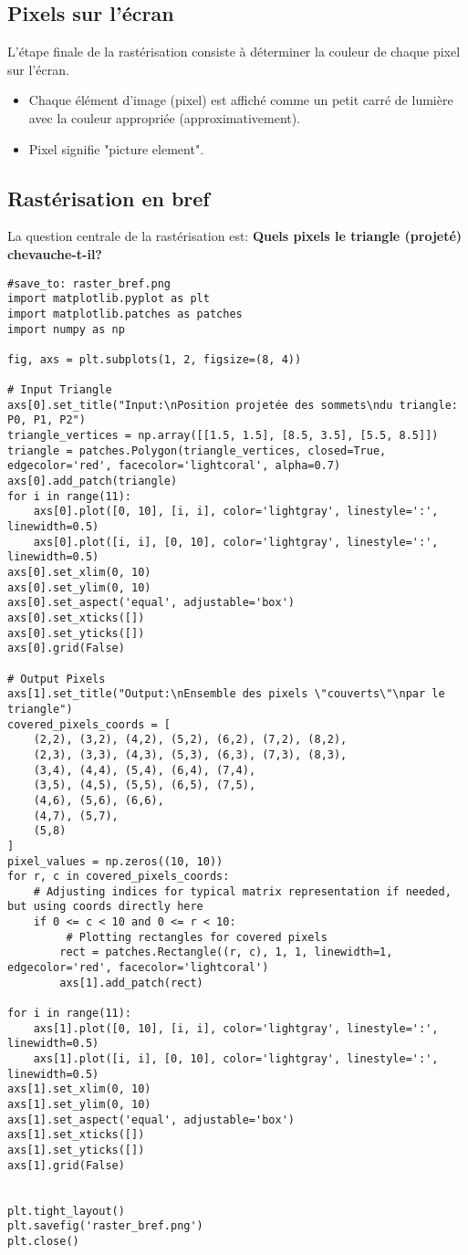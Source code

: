 \documentclass{article}
\begin{document}
\subsection{Pixels sur l'écran}
L'étape finale de la rastérisation consiste à déterminer la couleur de chaque pixel sur l'écran.
\begin{itemize}
    \item Chaque élément d'image (pixel) est affiché comme un petit carré de lumière avec la couleur appropriée (approximativement).
    \item Pixel signifie "picture element".
\end{itemize}

\subsection{Rastérisation en bref}
La question centrale de la rastérisation est: \textbf{Quels pixels le triangle (projeté) chevauche-t-il?}

\begin{verbatim}
#save_to: raster_bref.png
import matplotlib.pyplot as plt
import matplotlib.patches as patches
import numpy as np

fig, axs = plt.subplots(1, 2, figsize=(8, 4))

# Input Triangle
axs[0].set_title("Input:\nPosition projetée des sommets\ndu triangle: P0, P1, P2")
triangle_vertices = np.array([[1.5, 1.5], [8.5, 3.5], [5.5, 8.5]])
triangle = patches.Polygon(triangle_vertices, closed=True, edgecolor='red', facecolor='lightcoral', alpha=0.7)
axs[0].add_patch(triangle)
for i in range(11):
    axs[0].plot([0, 10], [i, i], color='lightgray', linestyle=':', linewidth=0.5)
    axs[0].plot([i, i], [0, 10], color='lightgray', linestyle=':', linewidth=0.5)
axs[0].set_xlim(0, 10)
axs[0].set_ylim(0, 10)
axs[0].set_aspect('equal', adjustable='box')
axs[0].set_xticks([])
axs[0].set_yticks([])
axs[0].grid(False)

# Output Pixels
axs[1].set_title("Output:\nEnsemble des pixels \"couverts\"\npar le triangle")
covered_pixels_coords = [
    (2,2), (3,2), (4,2), (5,2), (6,2), (7,2), (8,2),
    (2,3), (3,3), (4,3), (5,3), (6,3), (7,3), (8,3),
    (3,4), (4,4), (5,4), (6,4), (7,4),
    (3,5), (4,5), (5,5), (6,5), (7,5),
    (4,6), (5,6), (6,6),
    (4,7), (5,7),
    (5,8)
]
pixel_values = np.zeros((10, 10))
for r, c in covered_pixels_coords:
    # Adjusting indices for typical matrix representation if needed, but using coords directly here
    if 0 <= c < 10 and 0 <= r < 10:
         # Plotting rectangles for covered pixels
        rect = patches.Rectangle((r, c), 1, 1, linewidth=1, edgecolor='red', facecolor='lightcoral')
        axs[1].add_patch(rect)

for i in range(11):
    axs[1].plot([0, 10], [i, i], color='lightgray', linestyle=':', linewidth=0.5)
    axs[1].plot([i, i], [0, 10], color='lightgray', linestyle=':', linewidth=0.5)
axs[1].set_xlim(0, 10)
axs[1].set_ylim(0, 10)
axs[1].set_aspect('equal', adjustable='box')
axs[1].set_xticks([])
axs[1].set_yticks([])
axs[1].grid(False)


plt.tight_layout()
plt.savefig('raster_bref.png')
plt.close()
\end{verbatim}
\end{document}
